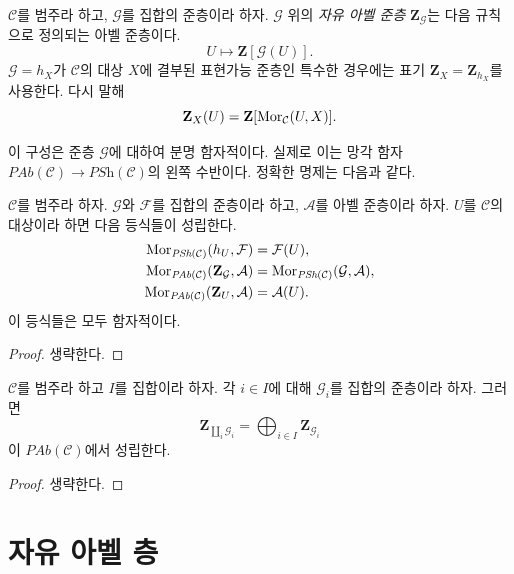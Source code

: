 \begin{definition}
\label{definition-free-abelian-presheaf-on}
$\mathcal{C}$를 범주라 하고, $\mathcal{G}$를 집합의 준층이라 하자.
$\mathcal{G}$ 위의 {\it 자유 아벨 준층} $\mathbf{Z}_\mathcal{G}$는 다음
규칙으로 정의되는 아벨 준층이다.
$$
U \longmapsto \mathbf{Z}[\mathcal{G}(U)].
$$
$\mathcal{G} = h_X$가 $\mathcal{C}$의 대상 $X$에 결부된 표현가능 준층인
특수한 경우에는 표기 $\mathbf{Z}_X = \mathbf{Z}_{h_X}$를 사용한다.
다시 말해
$$
\mathbf{Z}_X(U) = \mathbf{Z}[\mathop{\mathrm{Mor}}\nolimits_\mathcal{C}(U, X)].
$$
\end{definition}

\noindent
이 구성은 준층 $\mathcal{G}$에 대하여 분명 함자적이다. 실제로 이는 망각 함자
$\textit{PAb}(\mathcal{C}) \to \textit{PSh}(\mathcal{C})$의 왼쪽 수반이다.
정확한 명제는 다음과 같다.

\begin{lemma}
\label{lemma-obvious-adjointness}
$\mathcal{C}$를 범주라 하자. $\mathcal{G}$와 $\mathcal{F}$를 집합의
준층이라 하고, $\mathcal{A}$를 아벨 준층이라 하자. $U$를
$\mathcal{C}$의 대상이라 하면 다음 등식들이 성립한다.
\begin{align*}
\mathop{\mathrm{Mor}}\nolimits_{\textit{PSh}(\mathcal{C})}(h_U, \mathcal{F})
& =
\mathcal{F}(U), \\
\mathop{\mathrm{Mor}}\nolimits_{\textit{PAb}(\mathcal{C})}(\mathbf{Z}_\mathcal{G}, \mathcal{A})
& =
\mathop{\mathrm{Mor}}\nolimits_{\textit{PSh}(\mathcal{C})}(\mathcal{G}, \mathcal{A}), \\
\mathop{\mathrm{Mor}}\nolimits_{\textit{PAb}(\mathcal{C})}(\mathbf{Z}_U, \mathcal{A})
& =
\mathcal{A}(U).
\end{align*}
이 등식들은 모두 함자적이다.
\end{lemma}

\begin{proof}
생략한다.
\end{proof}

\begin{lemma}
\label{lemma-coproduct-sum-free-abelian-presheaf}
$\mathcal{C}$를 범주라 하고 $I$를 집합이라 하자. 각 $i \in I$에 대해
$\mathcal{G}_i$를 집합의 준층이라 하자. 그러면
$$
\mathbf{Z}_{\coprod_i \mathcal{G}_i}
=
\bigoplus\nolimits_{i \in I} \mathbf{Z}_{\mathcal{G}_i}
$$
이 $\textit{PAb}(\mathcal{C})$에서 성립한다.
\end{lemma}

\begin{proof}
생략한다.
\end{proof}



\section{자유 아벨 층}
\label{section-free-abelian-sheaf}

